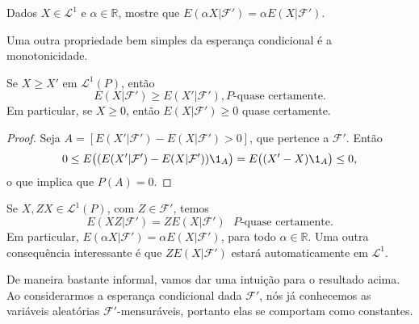 \begin{exercise}
  Dados $X \in \mathcal{L}^1$ e $\alpha \in \mathbb{R}$, mostre que $E(\alpha X|\mathcal{F}') = \alpha E(X|\mathcal{F}')$.
\end{exercise}

Uma outra propriedade bem simples da esperança condicional é a monotonicidade.

\begin{lemma}
  \label{l:ec_mono}
  Se $X \geq X'$ em $\mathcal{L}^1(P)$, então
  \begin{equation}
    E(X|\mathcal{F}') \geq E(X'|\mathcal{F}'), \text{$P$-quase certamente.}
  \end{equation}
  Em particular, se $X \geq 0$, então $E(X|\mathcal{F}') \geq 0$ quase certamente.
\end{lemma}

\begin{proof}
  Seja $A = [E(X'|\mathcal{F}') - E(X|\mathcal{F}') > 0]$, que pertence a $\mathcal{F}'$.
  Então
  \begin{equation}
    0 \leq E\big( (E(X'|\mathcal{F}') - E(X|\mathcal{F}')) \1_A \big) = E\big((X' - X) \1_A\big) \leq 0,
  \end{equation}
  o que implica que $P(A) = 0$.
\end{proof}

\begin{proposition}
  \label{p:EZX_ZEX}
  Se $X, ZX \in \mathcal{L}^1(P)$, com $Z \in \mathcal{F}'$, temos
  \begin{equation}
    E(XZ|\mathcal{F}') = Z E(X|\mathcal{F}') \text{ $P$-quase certamente}.
  \end{equation}
  Em particular, $E(\alpha X|\mathcal{F}') = \alpha E(X|\mathcal{F}')$, para todo $\alpha \in \mathbb{R}$.
  Uma outra consequência interessante é que $Z E(X|\mathcal{F}')$ estará automaticamente em $\mathcal{L}^1$.
\end{proposition}

De maneira bastante informal, vamos dar uma intuição para o resultado acima.
Ao considerarmos a esperança condicional dada $\mathcal{F}'$, nós já conhecemos as variáveis aleatórias $\mathcal{F}'$-mensuráveis, portanto elas se comportam como constantes.

